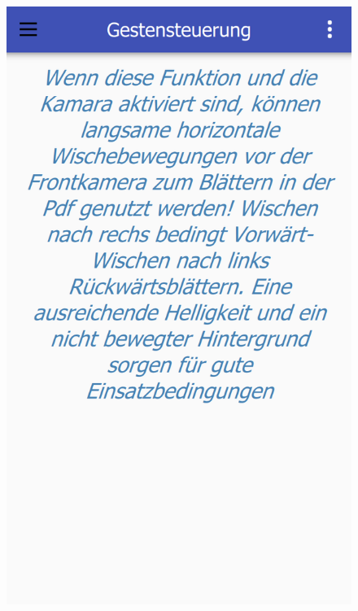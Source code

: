 \begin{figure}[ht!]
\begin{minipage}{0.31\linewidth}
		\centering
		\includegraphics[scale=0.5]{GUI/Bilder/Gestensteuerung.PNG}
	\end{minipage}
	\begin{minipage}{0.31\linewidth}
		\centering

\end{minipage}
\end{figure}
